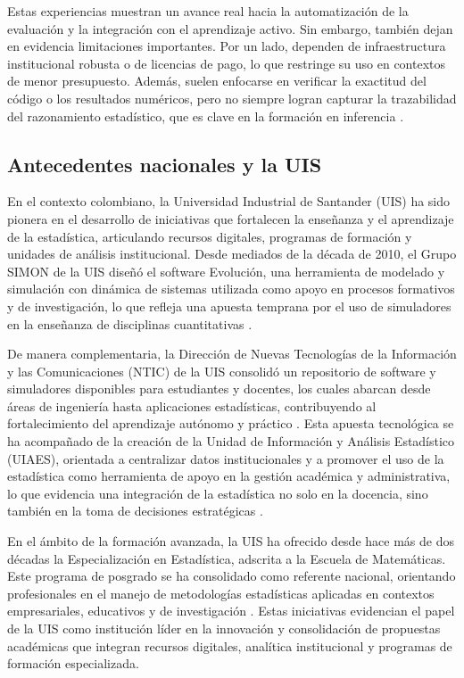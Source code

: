 \documentclass[letter,oneside,12pt,spanish]{report}
\begin{document}
Estas experiencias muestran un avance real hacia la automatización de la evaluación y la integración con el aprendizaje activo. Sin embargo, también dejan en evidencia limitaciones importantes. Por un lado, dependen de infraestructura institucional robusta o de licencias de pago, lo que restringe su uso en contextos de menor presupuesto. Además, suelen enfocarse en verificar la exactitud del código o los resultados numéricos, pero no siempre logran capturar la trazabilidad del razonamiento estadístico, que es clave en la formación en inferencia \parencite{alhaddad2024}.



\subsection{Antecedentes nacionales y la UIS}

En el contexto colombiano, la Universidad Industrial de Santander (UIS) ha sido pionera en el 
desarrollo de iniciativas que fortalecen la enseñanza y el aprendizaje de la estadística, 
articulando recursos digitales, programas de formación y unidades de análisis institucional. 
Desde mediados de la década de 2010, el Grupo SIMON de la UIS diseñó el software Evolución, una 
herramienta de modelado y simulación con dinámica de sistemas utilizada como apoyo en procesos 
formativos y de investigación, lo que refleja una apuesta temprana por el uso de simuladores en 
la enseñanza de disciplinas cuantitativas \parencite{simon2016}.

De manera complementaria, la Dirección de Nuevas Tecnologías de la Información y las Comunicaciones
 (NTIC) de la UIS consolidó un repositorio de software y simuladores disponibles para estudiantes 
 y docentes, los cuales abarcan desde áreas de ingeniería hasta aplicaciones estadísticas, 
 contribuyendo al fortalecimiento del aprendizaje autónomo y práctico \parencite{nticsf}. Esta 
 apuesta tecnológica se ha acompañado de la creación de la Unidad de Información y Análisis 
 Estadístico (UIAES), orientada a centralizar datos institucionales y a promover el uso de la 
 estadística como herramienta de apoyo en la gestión académica y administrativa, lo que evidencia
  una integración de la estadística no solo en la docencia, sino también en la toma de decisiones 
  estratégicas \parencite{uiassf}.

En el ámbito de la formación avanzada, la UIS ha ofrecido desde hace más de dos décadas la 
Especialización en Estadística, adscrita a la Escuela de Matemáticas. Este programa de posgrado 
se ha consolidado como referente nacional, orientando profesionales en el manejo de metodologías 
estadísticas aplicadas en contextos empresariales, educativos y de investigación 
\parencite{especializacionstatssf}. Estas iniciativas evidencian el papel de la UIS como 
institución líder en la innovación y consolidación de propuestas académicas que integran 
recursos digitales, analítica institucional y programas de formación especializada.
\end{document}
